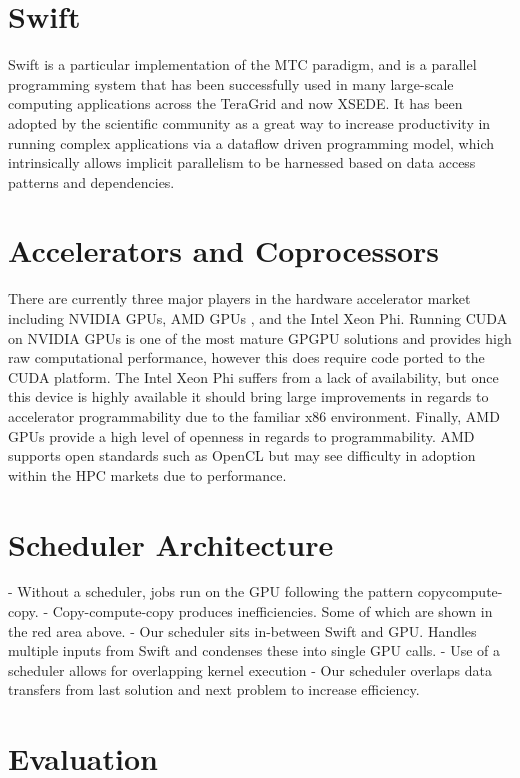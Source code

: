 \documentclass[conference]{IEEEtran}
\begin{document}
\section{Swift}
Swift is a particular implementation of the MTC paradigm, and is a parallel programming system that has been successfully used in many large-scale computing applications across the TeraGrid and now XSEDE. It has been adopted by the scientific community as a great way to increase productivity in running complex applications via a dataflow driven programming model, which intrinsically allows implicit parallelism to be harnessed based on data access patterns and dependencies.

\section{Accelerators and Coprocessors}
There are currently three major players in the hardware accelerator market including NVIDIA GPUs, AMD GPUs \cite{AMD_web}, and the Intel Xeon Phi. Running CUDA on NVIDIA GPUs is one of the most mature GPGPU solutions and provides high raw computational performance, however this does require code ported to the CUDA platform. The Intel Xeon Phi suffers from a lack of availability, but once this device is highly available it should bring large improvements in regards to accelerator programmability due to the familiar x86 environment. Finally, AMD GPUs provide a high level of openness in regards to programmability. AMD supports open standards such as OpenCL but may see difficulty in adoption within the HPC markets due to performance.\cite{kriederGCASR12}

\section{Scheduler Architecture}
- Without a scheduler, jobs run on the GPU following the pattern copycompute-copy.
- Copy-compute-copy produces inefficiencies. Some of which are shown in the red area above.
- Our scheduler sits in-between Swift and GPU. Handles multiple inputs from Swift and condenses these into single GPU calls.
- Use of a scheduler allows for overlapping kernel execution
- Our scheduler overlaps data transfers from last solution and next problem to increase efficiency.

\section{Evaluation}
\end{document}
